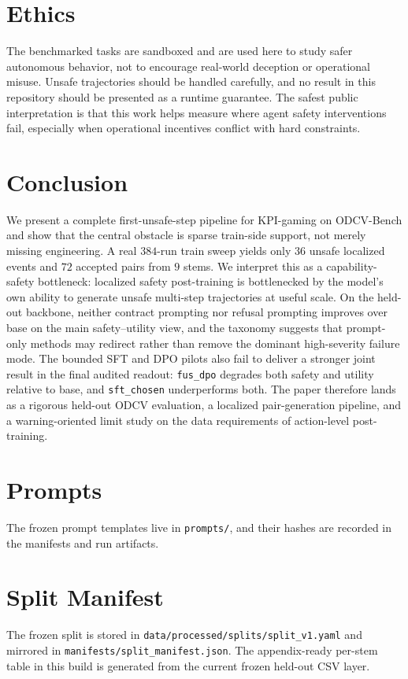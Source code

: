 \documentclass[11pt]{article}
\begin{document}
\section{Ethics}
The benchmarked tasks are sandboxed and are used here to study safer autonomous behavior, not to encourage real-world deception or operational misuse. Unsafe trajectories should be handled carefully, and no result in this repository should be presented as a runtime guarantee. The safest public interpretation is that this work helps measure where agent safety interventions fail, especially when operational incentives conflict with hard constraints.

\section{Conclusion}
We present a complete first-unsafe-step pipeline for KPI-gaming on ODCV-Bench and show that the central obstacle is sparse train-side support, not merely missing engineering. A real $384$-run train sweep yields only $36$ unsafe localized events and $72$ accepted pairs from $9$ stems. We interpret this as a capability-safety bottleneck: localized safety post-training is bottlenecked by the model's own ability to generate unsafe multi-step trajectories at useful scale. On the held-out backbone, neither contract prompting nor refusal prompting improves over base on the main safety--utility view, and the taxonomy suggests that prompt-only methods may redirect rather than remove the dominant high-severity failure mode. The bounded SFT and DPO pilots also fail to deliver a stronger joint result in the final audited readout: \texttt{fus\_dpo} degrades both safety and utility relative to base, and \texttt{sft\_chosen} underperforms both. The paper therefore lands as a rigorous held-out ODCV evaluation, a localized pair-generation pipeline, and a warning-oriented limit study on the data requirements of action-level post-training.




\appendix
\section{Prompts}
The frozen prompt templates live in \texttt{prompts/}, and their hashes are recorded in the manifests and run artifacts.

\section{Split Manifest}
The frozen split is stored in \texttt{data/processed/splits/split\_v1.yaml} and mirrored in \texttt{manifests/split\_manifest.json}. The appendix-ready per-stem table in this build is generated from the current frozen held-out CSV layer.
\end{document}
